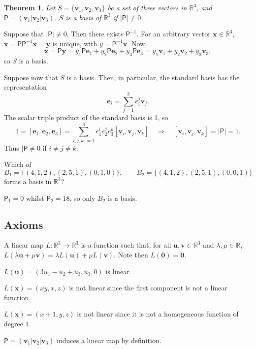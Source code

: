 \documentclass[10pt,notitlepage]{revtex4-1}
\newtheorem{theorem}{Theorem}[section]
\newenvironment{proof}[1][Proof]{\begin{trivlist}
\item[\hskip \labelsep {\bfseries #1}]}{\end{trivlist}}
\newenvironment{example}[1][Example]{\begin{trivlist}
\item[\hskip \labelsep {\bfseries #1}]}{\end{trivlist}}
\newcommand{\eb}{\boldsymbol{e}}
\newcommand{\xb}{\boldsymbol{x}}
\newcommand{\ub}{\boldsymbol{u}}
\newcommand{\vb}{\boldsymbol{v}}
\newcommand{\yb}{\boldsymbol{y}}
\begin{document}
\begin{theorem}
	Let $S=\{\vb_1,\vb_2,\vb_3\}$ be a set of three vectors in $\mathbb{R}^3$,
	and $\mathsf{P}=(\vb_1|\vb_2|\vb_3)$. $S$ is a basis of $\mathbb{R}^3$ if
	$|\mathsf{P}|\neq0$.
\end{theorem}
\begin{proof}
	Suppose that $|\mathsf{P}|\neq0$. Then there exists $\mathsf{P}^{-1}$. For
	an arbitrary vector $\xb\in\mathbb{R}^3$,
	$\xb=\mathsf{P}\mathsf{P}^{-1}\xb=\yb$ is unique, with
	$y=\mathsf{P}^{-1}\xb$. Now,
	\begin{equation}
		\xb=\mathsf{P}\yb=y_1 \mathsf{P}\eb_1 + y_2 \mathsf{P}\eb_2 +
		y_3 \mathsf{P}\eb_3 = y_1 \vb_1 + y_2 \vb_2 + y_3 \vb_3,
	\end{equation}
	so $S$ is a basis.
	
	Suppose now that $S$ is a basis. Then, in particular, the standard basis has
	the representation
	\begin{equation}
		\eb_i = \sum_{j=1}^3 e_i^j \vb_j.
	\end{equation}
	The scalar triple product of the standard basis is 1, so
	\begin{equation}
		1=[\eb_1,\eb_2,\eb_3]=\sum_{i,j,k,=1}^3 e_1^i e_2^j e_3^k
		[\vb_i,\vb_j,\vb_k]\quad\Rightarrow\quad
		[\vb_i,\vb_j,\vb_k]=|\mathsf{P}|=1.
	\end{equation}
	Thus $|\mathsf{P}\neq0$ if $i\neq j\neq k$.
\end{proof}
\begin{example}
	Which of
	\begin{equation}
		B_1=\{(4,1,2),(2,5,1),(0,1,0)\},\qquad B_2=\{(4,1,2),(2,5,1),(0,0,1)\}
	\end{equation}
	forms a basis in $\mathbb{R}^3$?
	
	$\mathsf{P}_1=0$ whilst $\mathsf{P}_2=18$, so only $B_2$ is a basis.
\end{example}


\subsection{Axioms}

A linear map $L:\mathbb{R}^3\rightarrow\mathbb{R}^3$ is a function such that,
for all $\ub,\vb\in\mathbb{R}^3$ and $\lambda,\mu\in\mathbb{R}$,
$L(\lambda\ub+\mu\vb)=\lambda L(\ub)+\mu L(\vb)$. Note then
$L(\boldsymbol{0})=\boldsymbol{0}$.
\begin{example}
	$L(\ub)=(3u_1 -u_2 +u_3, u_3, 0)$ is linear.
	
	$L(\xb)=(xy,x,z)$ is not linear since the first component is not a linear
	function.
	
	$L(\xb)=(x+1,y,z)$ is not linear since it is not a homogeneous function of
	degree $1$.
	
	$\mathsf{P}=(\vb_1 |\vb_2 |\vb_3)$ induces a linear map by definition.
\end{example}
\end{document}
